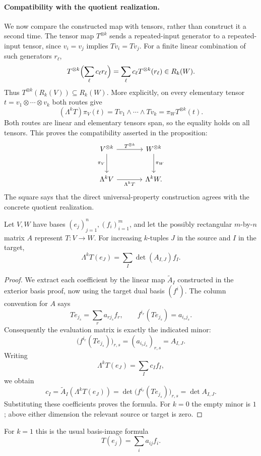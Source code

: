 \paragraph{Compatibility with the quotient realization.}
We now compare the constructed map with tensors, rather than construct it
a second time. The tensor map $T^{\otimes k}$ sends a repeated-input
generator to a repeated-input tensor, since $v_i=v_j$ implies $Tv_i=Tv_j$.
For a finite linear combination of such generators $r_\ell$,
\[
T^{\otimes k}\Bigl(\sum_\ell c_\ell r_\ell\Bigr)
=\sum_\ell c_\ell T^{\otimes k}(r_\ell)\in R_k(W).
\]
Thus $T^{\otimes k}(R_k(V))\subseteq R_k(W)$. More explicitly, on every
elementary tensor $t=v_1\otimes\cdots\otimes v_k$ both routes give
\[
(\Lambda^kT)\pi_V(t)=Tv_1\wedge\cdots\wedge Tv_k
=\pi_WT^{\otimes k}(t).
\]
Both routes are linear and elementary tensors span, so the equality holds
on all tensors. This proves the compatibility asserted in the proposition:
\[
\begin{tikzcd}[column sep=large,row sep=large]
V^{\otimes k}\arrow[r,"T^{\otimes k}"]\arrow[d,"\pi_V"']&
W^{\otimes k}\arrow[d,"\pi_W"]\\
\Lambda^kV\arrow[r,"\Lambda^kT"']&\Lambda^kW.
\end{tikzcd}
\]
The square says that the direct universal-property construction agrees
with the concrete quotient realization.

\begin{proposition}\label{prop:exterior-minors}
Let $V,W$ have bases $(e_j)_{j=1}^n,(f_i)_{i=1}^m$, and let the
possibly rectangular $m$-by-$n$ matrix $A$ represent $T:V\to W$.
For increasing $k$-tuples $J$ in the source and $I$ in the target,
\[
\Lambda^kT(e_J)=\sum_I\det(A_{I,J})f_I.
\]
\end{proposition}
\begin{proof}
We extract each coefficient by the linear map $\widetilde A_I$ constructed in
the exterior basis proof, now using the target dual basis $(f^i)$.
The column convention for $A$ says
\[
Te_{j_s}=\sum_r a_{rj_s}f_r,\qquad
f^{i_r}(Te_{j_s})=a_{i_rj_s}.
\]
Consequently the evaluation matrix is exactly the indicated minor:
\[
\bigl(f^{i_r}(Te_{j_s})\bigr)_{r,s}
=(a_{i_rj_s})_{r,s}=A_{I,J}.
\]
Writing
\[
\Lambda^kT(e_J)=\sum_I c_I f_I,
\]
 we obtain
\[
c_I=\widetilde A_I(\Lambda^kT(e_J))
=\det\bigl(f^{i_r}(Te_{j_s})\bigr)_{r,s}=\det A_{I,J}.
\]
Substituting these coefficients proves the formula. For $k=0$ the empty
minor is $1$; above either dimension the relevant source or target is zero.
\end{proof}
For $k=1$ this is the usual basis-image formula
\[
T(e_j)=\sum_i a_{ij}f_i.
\]

